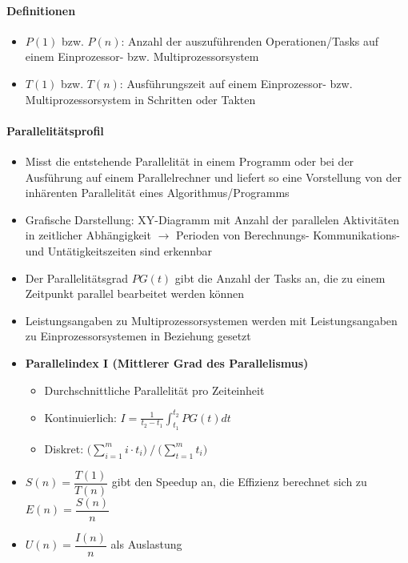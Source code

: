 	\paragraph{Definitionen}
		\begin{itemize}
			\item \(P(1)\) bzw. \(P(n)\): Anzahl der auszuführenden Operationen/Tasks auf einem Einprozessor- bzw. Multiprozessorsystem
			\item \(T(1)\) bzw. \(T(n)\): Ausführungszeit auf einem Einprozessor- bzw. Multiprozessorsystem in Schritten oder Takten
		\end{itemize}

	\paragraph{Parallelitätsprofil}
		\begin{itemize}
			\item Misst die entstehende Parallelität in einem Programm oder bei der Ausführung auf einem Parallelrechner und liefert so eine Vorstellung von der inhärenten Parallelität eines Algorithmus/Programms
			\item Grafische Darstellung: XY-Diagramm mit Anzahl der parallelen Aktivitäten in zeitlicher Abhängigkeit \(\rightarrow\) Perioden von Berechnungs- Kommunikations- und Untätigkeitszeiten sind erkennbar
			\item Der Parallelitätsgrad \(PG(t)\) gibt die Anzahl der Tasks an, die zu einem Zeitpunkt parallel bearbeitet werden können
			\item Leistungsangaben zu Multiprozessorsystemen werden mit Leistungsangaben zu Einprozessorsystemen in Beziehung gesetzt
			\item \textbf{Parallelindex I (Mittlerer Grad des Parallelismus)}
			\begin{itemize}
				\item Durchschnittliche Parallelität pro Zeiteinheit
				\item Kontinuierlich: \(I = \frac{1}{t_2-t_1}\int_{t_1}^{t_2}PG(t)dt\)
				\item Diskret: \(\Big(\sum_{i=1}^m i\cdot t_i\Big)~/~\Big(\sum_{t=1}^mt_i\Big)\)
			\end{itemize}
			\item $S(n)=\dfrac{T(1)}{T(n)}$ gibt den Speedup an, die Effizienz berechnet sich zu $E(n)=\dfrac{S(n)}{n}$
			\item $U(n)=\dfrac{I(n)}{n}$ als Auslastung 
		\end{itemize}

